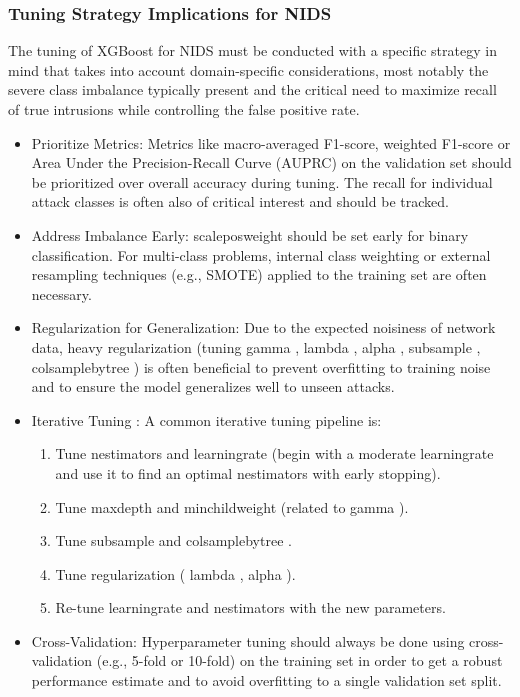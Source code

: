 \subsubsection{Tuning Strategy Implications for NIDS} 
The tuning of XGBoost for NIDS must be conducted with a specific strategy in mind that takes into account domain-specific considerations, most notably the severe class imbalance typically present and the critical need to maximize recall of true intrusions while controlling the false positive rate.
\begin{itemize}[noitemsep] 
\item Prioritize Metrics: Metrics like macro-averaged F1-score, weighted F1-score or Area Under the Precision-Recall Curve (AUPRC) on the validation set should be prioritized over overall accuracy during tuning. The recall for individual attack classes is often also of critical interest and should be tracked.
\item Address Imbalance Early: scale\textunderscore pos\textunderscore weight should be set early for binary classification. For multi-class problems, internal class weighting or external resampling techniques (e.g., SMOTE) applied to the training set are often necessary.
\item Regularization for Generalization: Due to the expected noisiness of network data, heavy regularization (tuning gamma , lambda , alpha , subsample , colsample\textunderscore bytree ) is often beneficial to prevent overfitting to training noise and to ensure the model generalizes well to unseen attacks.
\item Iterative Tuning : A common iterative tuning pipeline is: 
\begin{enumerate} 
\item Tune n\textunderscore estimators and learning\textunderscore rate (begin with a moderate learning\textunderscore rate and use it to find an optimal n\textunderscore estimators with early stopping).
\item Tune max\textunderscore depth and min\textunderscore child\textunderscore weight (related to gamma ).
\item Tune subsample and colsample\textunderscore bytree . 
\item Tune regularization ( lambda , alpha ). 
\item Re-tune learning\textunderscore rate and n\textunderscore estimators with the new parameters.
\end{enumerate} 
\item Cross-Validation: Hyperparameter tuning should always be done using cross-validation (e.g., 5-fold or 10-fold) on the training set in order to get a robust performance estimate and to avoid overfitting to a single validation set split.
\end{itemize} 

